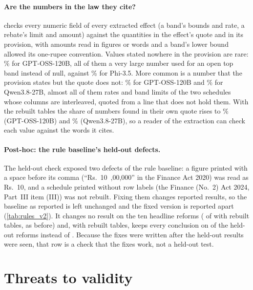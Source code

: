 \documentclass[sn-apa]{sn-jnl}
\begin{document}
\paragraph{Are the numbers in the law they cite?}
 checks every numeric field of every extracted
effect (a band's bounds and rate, a rebate's limit and amount) against the
quantities in the effect's quote and in its provision, with amounts read in
figures or words and a band's lower bound allowed its one-rupee convention.
Values stated nowhere in the provision are rare: \%
for GPT-OSS-120B, all of them a very large number used for an open top band
instead of null, against \% for Phi-3.5.
More common is a number that the provision states but the quote does not:
\% for GPT-OSS-120B and
\% for Qwen3.8-27B, almost all of
them rates and band limits of the two schedules whose columns are
interleaved, quoted from a line that does not hold them. With the
rebuilt tables the share of numbers found in their own quote rises to
\% (GPT-OSS-120B) and
\% (Qwen3.8-27B), so a reader of the
extraction can check each value against the words it cites.


\paragraph{Post-hoc: the rule baseline's held-out defects.} The held-out
check exposed two defects of the rule baseline: a figure printed with a
space before its comma (``Rs.~10~,00,000'' in the Finance Act 2020) was read
as Rs.~10, and a schedule printed without row labels (the Finance (No.~2)
Act 2024, Part~III item (III)) was not rebuilt. Fixing them changes reported
results, so the baseline as reported is left unchanged and the fixed version
is reported apart (\cref{tab:rules_v2}). It changes no result on the ten
headline reforms ( of  with rebuilt
tables, as before) and, with rebuilt tables, keeps every conclusion on
 of the  held-out reforms instead of
. Because the fixes were written after the
held-out results were seen, that row is a check that the fixes work, not a
held-out test.


\section{Threats to validity}\label{sec:threats}
\end{document}
